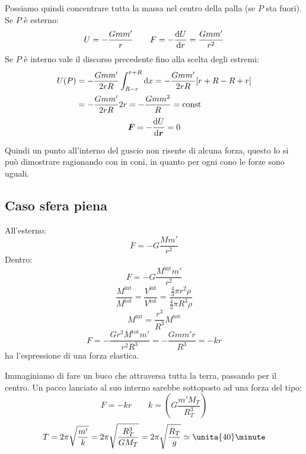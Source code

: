 Possiamo quindi concentrare tutta la massa nel centro della palla (se $P$ sta fuori).
Se $P$ è esterno: $$U=-\frac{Gmm'}{r}\qquad F=-\frac{\mathrm{d} U}{\mathrm{d}
r}=\frac{Gmm'}{r^2}$$
Se $P$ è interno vale il discorso precedente fino alla scelta degli
estremi:
\begin{align*}
U(P)&=-\frac{Gmm'}{2rR}\int_{R-r}^{r+R}\mathrm{d} x=-\frac{Gmm'}{2rR}[r+R-R+r]\\
&=-\frac{Gmm'}{2rR}2r=-\frac{Gmm^2}{R}=\text{const}
\end{align*}
\begin{equation*}\boldsymbol{F}=-\frac{\mathrm{d} U}{\mathrm{d} \boldsymbol{r}}=0\end{equation*}

Quindi un punto all'interno del guscio non risente di alcuna
forza, questo lo si può dimostrare ragionando con in coni, in
quanto per ogni cono le forze sono uguali.
\subsection{Caso sfera piena}
All'esterno:
\begin{equation*}F=-G\frac{Mm'}{r^2}\end{equation*}
Dentro:
\begin{equation*}F=-G\frac{M^{\text{int}}m'}{r^2}\end{equation*}
\begin{equation*}\frac{M^{\text{int}}}{M^{\text{tot}}}=\frac{V^{\text{int}}}{V^{\text{tot}}}=\frac{\frac{4}{3}\pi r^2\rho}{\frac{4}{3}\pi R^3\rho}\end{equation*}
\begin{equation*}M^{\text{int}}=\frac{r^3}{R^3}M^{\text{tot}}\end{equation*}
\begin{equation*}F=-\frac{Gr^3M^{\text{tot}}m'}{r^2R^3}=-\frac{Gmm'r}{R^3}=-kr\end{equation*}
ha l'espressione di una forza elastica.

\begin{Es}
Immaginiamo di fare un buco che attraversa tutta la terra, passando per il centro. Un pacco lanciato al suo interno sarebbe sottoposto ad una forza del tipo:
\begin{equation*}F=-kr\qquad k=\left(G\frac{m'M_T}{R_T^3}\right)\end{equation*}
\begin{equation*}T=2\pi\sqrt{\frac{m'}{k}}=2\pi\sqrt{\frac{R_T^3}{GM_T}}=2\pi\sqrt{\frac{R_T}{g}}\simeq \unita{40}\minute\end{equation*}
\end{Es}
